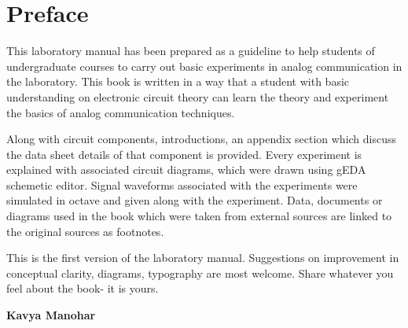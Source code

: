 \chapter*{Preface} 

This laboratory manual has been prepared as a guideline to help students of undergraduate courses to carry out basic experiments in analog communication in the laboratory. This book is written in a way that a student with basic understanding on electronic circuit theory can learn the theory and experiment the basics of analog communication techniques.

Along with circuit components, introductions, an appendix section which discuss the data sheet details of that component is provided. Every experiment is explained with associated circuit diagrams, which were drawn using gEDA schemetic editor. Signal waveforms associated with the experiments were simulated in octave and given along with the experiment. Data, documents or diagrams used in the 
book which were taken from external sources are linked to the original sources as footnotes.

This is the first version of the laboratory manual. Suggestions on improvement in conceptual clarity, diagrams, typography are most welcome. Share whatever you feel about the book- it is yours.

\begin{flushright}
\textbf{Kavya Manohar}
\end{flushright}